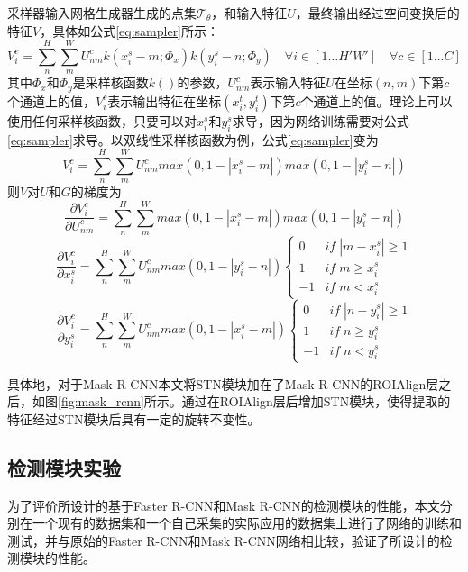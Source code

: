 采样器输入网格生成器生成的点集$\mathcal{T}_\theta$，和输入特征$U$，最终输出经过空间变换后的特征$V$，具体如公式\ref{eq:sampler}所示：
\begin{equation}
  \label{eq:sampler}
  V_i^c = \sum_n^H\sum_m^W{U_{nm}^ck(x_i^s-m;\Phi_x)k(y_i^s-n;\Phi_y)}\quad \forall i\in[1\ldots H'W']\quad \forall c\in[1\ldots C]
\end{equation}
其中$\Phi_{x}$和$\Phi_{y}$是采样核函数$k()$的参数，$U_{nm}^c$表示输入特征$U$在坐标$(n, m)$下第$c$个通道上的值，$V_i^c$表示输出特征在坐标$(x_i^t,y_i^t)$下第$c$个通道上的值。理论上可以使用任何采样核函数，只要可以对$x_i^s$和$y_i^s$求导，因为网络训练需要对公式\ref{eq:sampler}求导。以双线性采样核函数为例，公式\ref{eq:sampler}变为
\begin{equation}
  V_i^c = \sum_n^H\sum_m^W{U_{nm}^cmax(0, 1-|x_i^s-m|)max(0, 1-|y_i^s-n|)}
\end{equation}
则$V$对$U$和$G$的梯度为
\begin{equation}
  \frac{\partial V_i^c}{\partial U_{nm}^c} = \sum_n^H\sum_m^W{max(0, 1-|x_i^s-m|)max(0, 1-|y_i^s-n|)}
\end{equation}
\begin{equation}
  \frac{\partial V_i^c}{\partial x_i^s} = \sum_n^H\sum_m^W{U_{nm}^cmax(0, 1-|y_i^s-n|)}
  \left\{
      \begin{array}{ll}
        0&if\; |m-x_i^s| \geq 1\\
        1&if\; m \geq x_i^s\\
        -1&if\; m < x_i^s
      \end{array}
    \right.
\end{equation}
\begin{equation}
  \frac{\partial V_i^c}{\partial y_i^s} = \sum_n^H\sum_m^W{U_{nm}^cmax(0, 1-|x_i^s-m|)}
  \left\{
      \begin{array}{ll}
        0&if\; |n-y_i^s| \geq 1\\
        1&if\; n \geq y_i^s\\
        -1&if\; n < y_i^s
      \end{array}
    \right.
\end{equation}

具体地，对于Mask R-CNN本文将STN模块加在了Mask R-CNN的ROIAlign层之后，如图\ref{fig:mask_rcnn}所示。通过在ROIAlign层后增加STN模块，使得提取的特征经过STN模块后具有一定的旋转不变性。

\subsection{检测模块实验}
为了评价所设计的基于Faster R-CNN和Mask R-CNN的检测模块的性能，本文分别在一个现有的数据集和一个自己采集的实际应用的数据集上进行了网络的训练和测试，并与原始的Faster R-CNN和Mask R-CNN网络相比较，验证了所设计的检测模块的性能。

